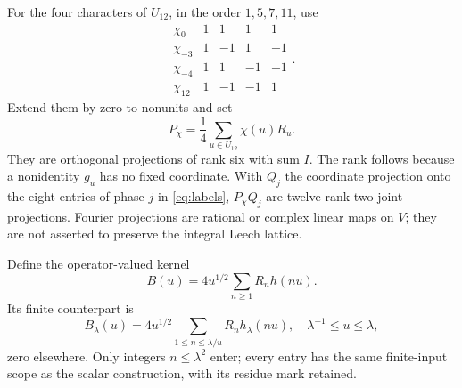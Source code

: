 \documentclass[11pt,reqno]{amsart}
\theoremstyle{definition}\newtheorem{definition}[theorem]{Definition}
\theoremstyle{remark}\newtheorem{remark}[theorem]{Remark}
\begin{document}
For the four characters of $U_{12}$, in the order $1,5,7,11$, use
\[
\begin{array}{c|rrrr}
\chi_0&1&1&1&1\\
\chi_{-3}&1&-1&1&-1\\
\chi_{-4}&1&1&-1&-1\\
\chi_{12}&1&-1&-1&1
\end{array}.
\]
Extend them by zero to nonunits and set
\[
P_\chi=\frac14\sum_{u\in U_{12}}\chi(u)R_u.
\]
They are orthogonal projections of rank six with sum $I$. The rank follows because a nonidentity $g_u$ has no fixed coordinate. With $Q_j$ the coordinate projection onto the eight entries of phase $j$ in \eqref{eq:labels}, $P_\chi Q_j$ are twelve rank-two joint projections. Fourier projections are rational or complex linear maps on $V$; they are not asserted to preserve the integral Leech lattice.

Define the operator-valued kernel
\begin{equation}\label{eq:BK}
B(u)=4u^{1/2}\sum_{n\ge1}R_nh(nu).
\end{equation}
Its finite counterpart is
\begin{equation}\label{eq:BKl}
B_\lambda(u)=4u^{1/2}\sum_{1\le n\le\lambda/u}R_nh_\lambda(nu),
\quad \lambda^{-1}\le u\le\lambda,
\end{equation}
zero elsewhere. Only integers $n\le\lambda^2$ enter; every entry has the same finite-input scope as the scalar construction, with its residue mark retained.
\end{document}
